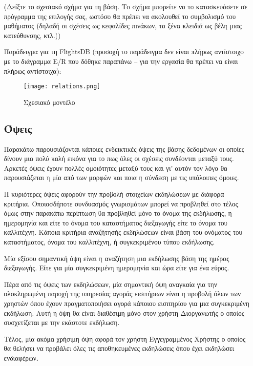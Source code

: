 (Δείξτε το σχεσιακό σχήμα για τη βάση. Το σχήμα μπορείτε να το
κατασκευάσετε σε πρόγραμμα της επιλογής σας, ωστόσο θα πρέπει να
ακολουθεί το συμβολισμό του μαθήματος (δηλαδή οι σχέσεις ως κεφαλίδες
πινάκων, τα ξένα κλειδιά ως βέλη μιας κατεύθυνσης, κτλ.))

Παράδειγμα για τη FlightsDB (προσοχή το παράδειγμα δεν είναι πλήρως
αντίστοιχο με το διάγραμμα E/R που δόθηκε παραπάνω – για την εργασία
θα πρέπει να είναι πλήρως αντίστοιχα):

\begin{figure}[H]
  \centering
  \texttt{[image: relations.png]}
  \caption{Σχεσιακό μοντέλο}
\end{figure}

\subsection{Όψεις}

Παρακάτω παρουσιάζονται κάποιες ενδεικτικές όψεις της βάσης δεδομένων
οι οποίες δίνουν μια πολύ καλή εικόνα για το πως όλες οι σχέσεις
συνδέονται μεταξύ τους. Αρκετές όψεις έχουν πολλές ομοιότητες μεταξύ
τους και γι' αυτόν τον λόγο θα παρουσιάζεται η μία από των μορφών και
ποια η σύνδεση με τις υπόλοιπες όμοιες.

Η κυριότερες όψεις αφορούν την προβολή στοιχείων εκδηλώσεων με διάφορα
κριτήρια. Οποιοσδήποτε συνδυασμός γνωρισμάτων μπορεί να προβληθεί στο
τέλος όμως στην παρακάτω περίπτωση θα προβληθεί μόνο το όνομα της
εκδήλωσης, η ημερομηνία και είτε το όνομα του καταστήματος διεξαγωγής
είτε το όνομα του καλλιτέχνη. Κάποια κριτήρια αναζήτησής εκδηλώσεων
είναι βάση του ονόματος του καταστήματος, όνομα του καλλιτέχνη, ή
συγκεκριμένου τύπου εκδήλωσης.


Μία εξίσου σημαντική όψη είναι η αναζήτηση μια εκδήλωσης βάση της
ημέρας διεξαγωγής. Είτε για μία συγκεκριμένη ημερομηνία και ώρα είτε
για ένα εύρος.


Πέρα από τις όψεις των εκδηλώσεων, μία σημαντική όψη αναγκαία για την
ολοκληρωμένη παροχή της υπηρεσίας αγοράς εισιτήριων είναι η προβολή
όλων των χρηστών όπου έχουν πραγματοποιήσει αγορά κάποιου εισιτηρίου
για μια συγκεκριμένη εκδήλωση. Αυτή η όψη θα είναι διαθέσιμη μόνο στον
χρήστη Διοργανωτής ο οποίος συσχετίζεται με την εκάστοτε εκδήλωση.


Τέλος, μία ακόμα χρήσιμη όψη αφορά τον χρήστη Εγγεγραμμένος Χρήστης ο
οποίος θα θελήσει να προβάλει όλες τις αποθηκευμένες εκδηλώσεις όπου
έχει εκδηλώσει ενδιαφέρων.



